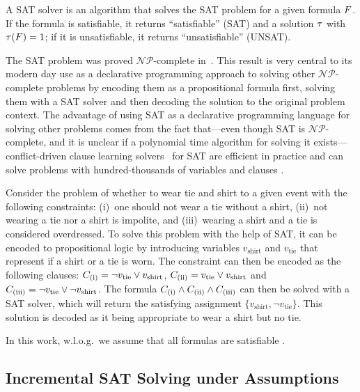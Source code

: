 A SAT solver is an algorithm that solves the SAT problem for a given formula $F$.
If the formula is satisfiable, it returns ``satisfiable'' (SAT) and a solution $\tau$ with $\tau(F)=1$;
if it is unsatisfiable, it returns ``unsatisfiable'' (UNSAT).

The SAT problem was proved $\mathcal{NP}$-complete in~\textcite{DBLP:conf/stoc/Cook71}.
This result is very central to its modern day use as a declarative programming approach to solving other $\mathcal{NP}$-complete problems by encoding them as a propositional formula first, solving them with a SAT solver and then decoding the solution to the original problem context.
The advantage of using SAT as a declarative programming language for solving other problems comes from the fact that---even though SAT is $\mathcal{NP}$-complete, and it is unclear if a polynomial time algorithm for solving it exists---conflict-driven clause learning solvers~\autocite{handbook2-cdcl} for SAT are efficient in practice and can solve problems with hundred-thousands of variables and clauses .
\begin{example}
  Consider the problem of whether to wear tie and shirt to a given event with the following constraints:
  (i)~one should not wear a tie without a shirt, (ii)~not wearing a tie nor a shirt is impolite, and (iii)~wearing a shirt and a tie is considered overdressed.
  To solve this problem with the help of SAT, it can be encoded to propositional logic by introducing variables $v_\text{shirt}$ and $v_\text{tie}$ that represent if a shirt or a tie is worn.
  The constraint can then be encoded as the following clauses:
  $C_\text{(i)} = \lnot v_\text{tie} \lor v_\text{shirt}$, $C_\text{(ii)} = v_\text{tie} \lor v_\text{shirt}$ and $C_\text{(iii)} = \lnot v_\text{tie} \lor \lnot v_\text{shirt}$.
  The formula $C_\text{(i)} \land C_\text{(ii)} \land C_\text{(iii)}$ can then be solved with a SAT solver, which will return the satisfying assignment $\{ v_\text{shirt}, \lnot v_\text{tie} \}$.
  This solution is decoded as it being appropriate to wear a shirt but no tie.
\end{example}

In this work, w.l.o.g.\ we assume that all formulas are satisfiable .

\subsection{Incremental SAT Solving under Assumptions\label{sec:inc-sat}}

